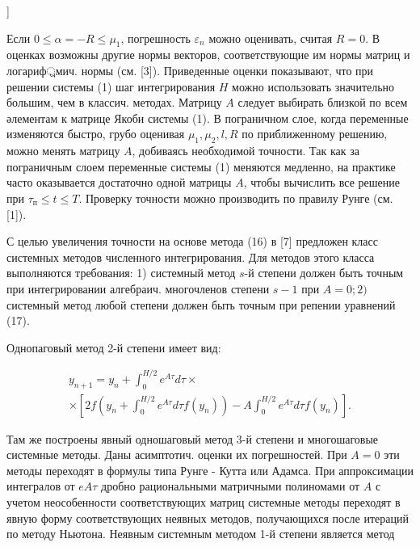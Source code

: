 \documentclass[10pt]{article}
\begin{document}
]



Если $0 \leqslant \alpha=-R \leqslant \mu_{1}$, погрешность $\varepsilon_{n}$ можно оценивать, считая $R=0$. В оценках возможны другие нормы векторов, соответствующие им нормы матриц и логариф্রмич. нормы (см. [3]). Приведенные оценки показывают, что при решении системы (1) шаг интегрирования $H$ можно использовать значительно большим, чем в классич. методах. Матрицу $A$ следует выбирать близкой по всем әлементам к матрице Якоби системы (1). В пограничном слое, когда переменные изменяются быстро, грубо оценивая $\mu_{1}, \mu_{2}, l, R$ по приближенному решению, можно менять матрицу $A$, добиваясь необходимой точности. Так как за пограничным слоем переменные системы (1) меняются медленно, на практике часто оказывается достаточно одной матрицы $A$, чтобы вычислить все решение при $\tau_{п} \leqslant t \leqslant T$. Проверку точности можно производить по правилу Рунге (см. [1]).



С целью увеличения точности на основе метода (16) в [7] предложен класс системных методов численного интегрирования. Для методов этого класса выполняются требования: 1) системный метод $s$-й степени должен быть точным при интегрировании алгебраич. многочленов степени $s-1$ при $A=0 ; 2)$ системный метод любой степени должен быть точным при репении уравнений (17).



Однопаговый метод 2-й степени имеет вид:



\[

\begin{gathered}

y_{n+1}=y_{n}+\int_{0}^{H / 2} e^{A \tau} d \tau \times \\

\times\left[2 f\left(y_{n}+\int_{0}^{H / 2} e^{A \tau} d \tau f\left(y_{n}\right)\right)-A \int_{0}^{H / 2} e^{A \tau} d \tau f\left(y_{n}\right)\right] .

\end{gathered}

\]



Там же построены явный одношаговый метод 3-й степени и многошаговые системные методы. Даны асимптотич. оценки их погрешностей. При $A=0$ эти методы переходят в формулы типа Рунге - Кутта или Адамса. При аппроксимации интегралов от $e A \tau$ дробно рациональными матричными полиномами от $A$ с учетом неособенности соответствующих матриц системные методы переходят в явную форму соответствующих неявных методов, получающихся после итераций по методу Ньютона. Неявным системным методом 1-й степени является метод
\end{document}
